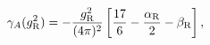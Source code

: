 \begin{equation}
\gamma_A(g_{\rm R}^2)
 =-\frac{g_{\rm R}^2}{(4\pi)^2} 
   \left[\frac{17}6-\frac{\alpha_{\rm R}}2-\beta_{\rm R}
   \right],
\end{equation}

